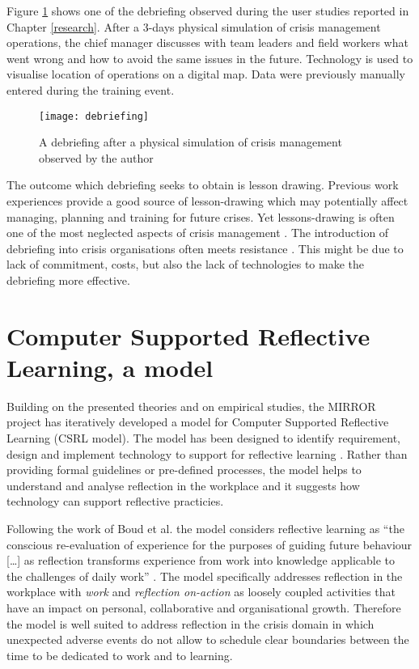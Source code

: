 Figure \ref{fig:debriefing-example} shows one of the debriefing observed during the user studies reported in Chapter \ref{research}. After a 3-days physical simulation of crisis management operations, the chief manager discusses with team leaders and field workers what went wrong and how to avoid the same issues in the future. Technology is used to visualise location of operations on a digital map. Data were previously manually entered during the training event.

\begin{figure}
	[tbh] \centering 
	\texttt{[image: debriefing]} \caption{A debriefing after a physical simulation of crisis management observed by the author} \label{fig:debriefing-example} 
\end{figure}

The outcome which debriefing seeks to obtain is lesson drawing. Previous work experiences provide a good source of lesson-drawing which may potentially affect managing, planning and training for future crises. Yet lessons-drawing is often one of the most neglected aspects of crisis management \autocites{Lagadec:1997js}{Stern:1997eb}. The introduction of debriefing into crisis organisations often meets resistance \autocite{Lagadec:1997js}. This might be due to lack of commitment, costs, but also the lack of technologies to make the debriefing more effective.

\section{Computer Supported Reflective Learning, a model}\label{computer-supported-reflective-learning-a-model}

Building on the presented theories and on empirical studies, the MIRROR project has iteratively developed a model for Computer Supported Reflective Learning (CSRL model). The model has been designed to identify requirement, design and implement technology to support for reflective learning \autocite{Krogstie:2013kf}. Rather than providing formal guidelines or pre-defined processes, the model helps to understand and analyse reflection in the workplace and it suggests how technology can support reflective practicies.

Following the work of Boud et al. \autocite*{boud1985reflection} the model considers reflective learning as ``the conscious re-evaluation of experience for the purposes of guiding future behaviour {[}\ldots{}{]} as reflection transforms experience from work into knowledge applicable to the challenges of daily work'' \autocite{Krogstie:2013kf}. The model specifically addresses reflection in the workplace with \emph{work} and \emph{reflection on-action} as loosely coupled activities that have an impact on personal, collaborative and organisational growth. Therefore the model is well suited to address reflection in the crisis domain in which unexpected adverse events do not allow to schedule clear boundaries between the time to be dedicated to work and to learning.

